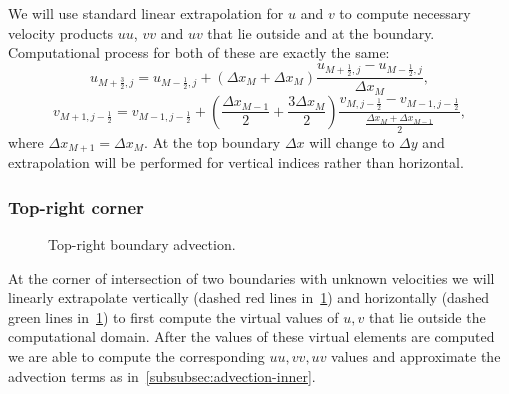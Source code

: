 \documentclass{article}
\numberwithin{equation}{section}
\begin{document}
We will use standard linear extrapolation for $u$ and $v$ to compute necessary velocity products $uu$, $vv$ and $uv$ that lie outside and at the boundary. Computational process for both of these are exactly the same:
\begin{equation}
	u_{M+\frac{3}{2},j}=u_{M-\frac{1}{2},j}+\left( {\Delta x_{M}} + \Delta x_{M} \right)\frac{u_{M+\frac{1}{2},j}-u_{M-\frac{1}{2},j}}{\Delta x_M},
\end{equation}
\begin{equation}
	v_{M+1,j-\frac{1}{2}}=v_{M-1,j-\frac{1}{2}}+\left( \frac{\Delta x_{M-1}}{2} + \frac{3\Delta x_{M}}{2} \right)\frac{v_{M,j-\frac{1}{2}}-v_{M-1,j-\frac{1}{2}}}{\frac{\Delta x_M+\Delta x_{M-1}}{2}},
\end{equation}
where $\Delta x_{M+1}=\Delta x_M$.
At the top boundary $\Delta x$ will change to $\Delta y$ and extrapolation will be performed for vertical indices rather than horizontal. 



\subsubsection{Top-right corner}\label{subsubsec:advection-corner}
\begin{figure}[H] %
  \caption{Top-right boundary advection.}\label{fig:ADV-top-right}
\end{figure}
At the corner of intersection of two boundaries with unknown velocities we will linearly extrapolate vertically (dashed red lines in~\cref{fig:ADV-top-right}) and horizontally (dashed green lines in~\cref{fig:ADV-top-right}) to first compute the virtual values of $u,v$ that lie outside the computational domain. After the values of these virtual elements are computed we are able to compute the corresponding $uu,vv,uv$ values and approximate the advection terms as in~\cref{subsubsec:advection-inner}.
\end{document}

